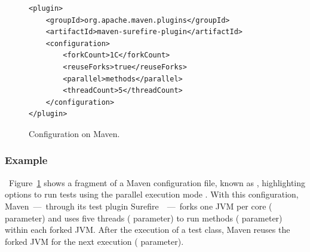 





\begin{figure}[h!]
\centering
\scriptsize
{}
\begin{lstlisting}
<plugin>
    <groupId>org.apache.maven.plugins</groupId>
    <artifactId>maven-surefire-plugin</artifactId>
    <configuration>
        <forkCount>1C</forkCount>
        <reuseForks>true</reuseForks>
        <parallel>methods</parallel>
        <threadCount>5</threadCount>
    </configuration>
</plugin>
\end{lstlisting}
    \caption{\label{fig:surefire} Configuration \ForkParMeth{} on Maven.}
\end{figure}

\subsubsection*{Example}~Figure~\ref{fig:surefire} shows a
fragment of a Maven configuration file, known as \pomf{}, highlighting
options to run tests using the parallel execution mode \ForkParMeth{}.
With this configuration, Maven~---~through its test plugin
Surefire~\cite{maven-surefire-plugin}~---~forks one JVM per core
( parameter) and uses five threads
( parameter) to run methods (
parameter) within each forked JVM. After the execution of a test
class, Maven reuses the forked JVM for the next execution
( parameter).

